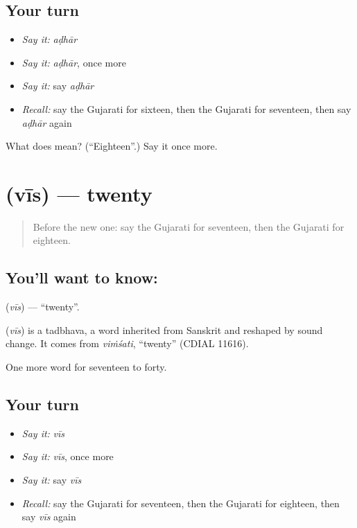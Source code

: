 \subsection*{Your turn}
\begin{itemize}
\raggedright
  \item \emph{Say it:} \emph{aḍhār}
  \item \emph{Say it:} \emph{aḍhār}, once more
  \item \emph{Say it:} say \emph{aḍhār}
  \item \emph{Recall:} say the Gujarati for sixteen, then the Gujarati for seventeen, then say \emph{aḍhār} again
\end{itemize}

\begin{tcolorbox}[breakable,colback=teal!4,colframe=teal!35!black,title={Before you move on}]
What does  mean? (\textquotedblleft{}Eighteen\textquotedblright{}.) Say it once more.
\end{tcolorbox}
\section[\texorpdfstring{\gu{વીસ} (vīs)}{વીસ (vīs)}]{ (vīs) — twenty}

\label{lesson:GU-C82-twenty}



\begin{quote}
Before the new one: say the Gujarati for seventeen, then the Gujarati for eighteen.
\end{quote}

\subsection*{You'll want to know: }
\textbf{} (\emph{vīs}) — \textquotedblleft{}twenty\textquotedblright{}.

\begin{cousinweb}
\textbf{} (\emph{vīs}) is a tadbhava, a word inherited from Sanskrit and reshaped by sound change. It comes from \emph{viṁśati}, \textquotedblleft{}twenty\textquotedblright{} (CDIAL 11616).
\end{cousinweb}

\begin{grammarlens}[title={What you've built}]
One more word for seventeen to forty.
\end{grammarlens}

\subsection*{Your turn}
\begin{itemize}
\raggedright
  \item \emph{Say it:} \emph{vīs}
  \item \emph{Say it:} \emph{vīs}, once more
  \item \emph{Say it:} say \emph{vīs}
  \item \emph{Recall:} say the Gujarati for seventeen, then the Gujarati for eighteen, then say \emph{vīs} again
\end{itemize}

